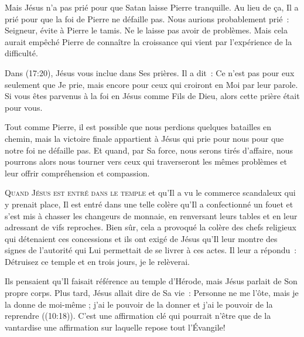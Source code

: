 Mais Jésus n'a pas prié pour que Satan laisse Pierre tranquille.
 Au lieu de ça, Il a prié pour que la foi de Pierre ne défaille pas.
 Nous aurions probablement prié~: \og Seigneur, évite à Pierre le tamis.
 Ne le laisse pas avoir de problèmes. \fg{}
 Mais cela aurait empêché Pierre de connaître la croissance qui vient
 par l'expérience de la difficulté.


Dans (17:20), Jésus vous inclue dans Ses prières.
 Il a dit~: 
 \og Ce n'est pas pour eux seulement que Je prie, mais encore pour ceux
 qui croiront en Moi par leur parole. \fg{}
 Si vous êtes parvenus à la foi en Jésus comme Fils de Dieu,
 alors cette prière était pour vous.

Tout comme Pierre, il est possible que nous perdions quelques batailles
 en chemin, mais la victoire  finale appartient à Jésus
 qui prie pour nous pour que notre foi ne défaille pas.
 Et quand, par Sa force, nous serons tirés d'affaire,
 nous pourrons alors nous tourner vers ceux qui traverseront
 les mêmes problèmes et leur offrir compréhension et compassion.

\dvrule






\lettrine{Q}{uand Jésus est entré dans le temple} et qu'Il a vu le commerce
 scandaleux qui y prenait place, Il est entré dans une telle colère
 qu'Il a confectionné un fouet et s'est mis à chasser les changeurs
 de monnaie, en renversant leurs tables et en leur adressant
 de vifs reproches. Bien sûr, cela a provoqué la colère des chefs religieux
 qui détenaient ces concessions et ils ont exigé de Jésus
 qu'Il leur montre des signes de l'autorité qui Lui permettait
 de se livrer à ces actes. Il leur a répondu~: 
 \og Détruisez ce temple et en trois jours, je le relèverai. \fg{}

Ils pensaient qu'Il faisait référence au temple d'Hérode,
 mais Jésus parlait de Son propre corps.
 Plus tard, Jésus allait dire de Sa vie~: 
 \og Personne ne me l'ôte, mais je la donne de moi-même ;
 j'ai le pouvoir de la donner et j'ai le pouvoir de la reprendre \fg{}
 ((10:18)).
 C'est une affirmation clé qui pourrait n'être que de la vantardise
 \ocadr une affirmation sur laquelle repose tout l'Évangile! 


